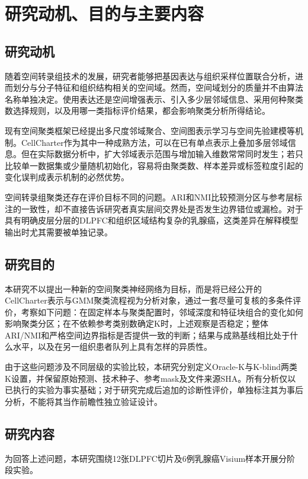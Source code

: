 \section{研究动机、目的与主要内容}
\label{sec:cc-intro-module-v1}

\subsection{研究动机}
随着空间转录组技术的发展，研究者能够把基因表达与组织采样位置联合分析，进而划分与分子特征和组织结构相关的空间域。然而，空间域划分的质量并不由算法名称单独决定。使用表达还是空间增强表示、引入多少层邻域信息、采用何种聚类数选择规则，以及用哪一类指标评价结果，都会影响聚类分析所得结论。

现有空间聚类框架已经提出多尺度邻域聚合、空间图表示学习与空间先验建模等机制。CellCharter作为其中一种成熟方法，可以在已有单点表示上叠加多层邻域信息\cite{varrone2024}。但在实际数据分析中，扩大邻域表示范围与增加输入维数常常同时发生；若只比较单一数据集或少量随机初始化，容易将由聚类数、样本差异或标签粒度引起的变化误判成表示机制的必然优势。

空间转录组聚类还存在评价目标不同的问题。ARI和NMI比较预测分区与参考层标注的一致性，却不直接告诉研究者真实层间交界处是否发生边界错位或漏检。对于具有明确皮层分层的DLPFC和组织区域结构复杂的乳腺癌，这类差异在解释模型输出时尤其需要被单独记录。

\subsection{研究目的}
本研究不以提出一种新的空间聚类神经网络为目标，而是将已经公开的CellCharter表示与GMM聚类流程视为分析对象，通过一套尽量可复核的多条件评价，考察如下问题：在固定样本与聚类配置时，邻域深度和特征块组合的变化如何影响聚类分区；在不依赖参考类别数确定K时，上述观察是否稳定；整体ARI/NMI和严格空间边界指标是否提供一致的判断；结果与成熟基线相比处于什么水平，以及在另一组织患者队列上具有怎样的异质性。

由于这些问题涉及不同层级的实验比较，本研究分别定义Oracle-K与K-blind两类K设置，并保留原始预测、技术种子、参考mask及文件来源SHA。所有分析仅以已执行的实验为事实基础；对于研究完成后追加的诊断性评价，单独标注其为事后分析，不能将其当作前瞻性独立验证设计。

\subsection{研究内容}
为回答上述问题，本研究围绕12张DLPFC切片及6例乳腺癌Visium样本开展分阶段实验。

